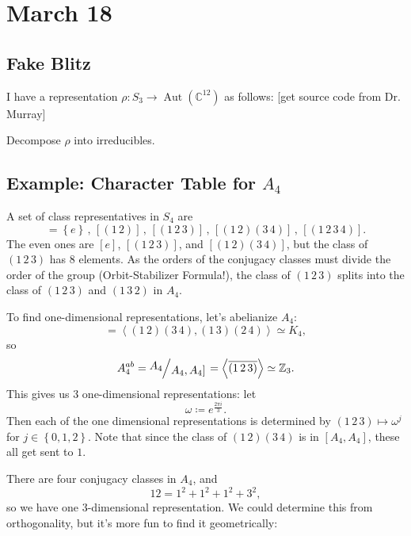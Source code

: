 \documentclass[12pt]{article}
\newcommand{\z}{\mathbb{Z}}
\newcommand{\cx}{\mathbb{C}}
\newcommand\setb[1]{\left \{ #1 \right \}}
\newcommand{\vbrack}[1]{\left \langle #1 \right \rangle}
\newcommand{\quotient}[2]{{\makebox[\width-2.3pt][l]{\raisebox{.2em}{$#1$}}\left/\raisebox{-.2em}{$#2$}\right.}}
\theoremstyle{definition}
\DeclareMathOperator\Aut{Aut}
\begin{document}
\section{March 18}
\subsection{Fake Blitz}
I have a representation $\rho : S_3 \to \Aut(\cx^{12})$ as follows: [get source code from Dr. Murray]

Decompose $\rho$ into irreducibles.
\subsection{Example: Character Table for \texorpdfstring{$A_4$}{A4}}
A set of class representatives in $S_4$ are 
\begin{equation}
    [e] = \setb{e} \,,\,  [(1\,2)] \,,\, [(1\,2\,3)] \,,\, [(1\,2)(3\,4)] \,,\, [(1\,2\,3\,4)].
\end{equation}
The even ones are $[e]$, $[(1\,2\,3)]$, and $[(1\,2)(3\,4)]$, but the class of $(1\,2\,3)$ has 8 elements. As the orders of the conjugacy classes must divide the order of the group (Orbit-Stabilizer Formula!), the class of $(1\,2\,3)$ splits into the class of $(1\,2\,3)$ and $(1\,3\,2)$ in $A_4$. 

To find one-dimensional representations, let's abelianize $A_4$:
\begin{equation}
    [A_4 , A_4] = \vbrack{(1\,2)(3\,4) , (1\,3)(2\,4)} \simeq K_4,
\end{equation}
so 
\begin{equation}
    A_4^{ab} = \quotient{A_4}{A_4 , A_4]} = \left \langle \overline{(1\,2\,3)} \right \rangle \simeq \z_3.
\end{equation}
This gives us 3 one-dimensional representations: let 
\begin{equation}
    \omega \coloneqq  e^{\frac{2\pi i}{3}}.
\end{equation}
Then each of the one dimensional representations is determined by $(1\,2\,3) \mapsto \omega^j$ for $j \in \setb{0,1,2}$. Note that since the class of $(1\,2)(3\,4)$ is in $[A_4 , A_4]$, these all get sent to $1$.

There are four conjugacy classes in $A_4$, and 
\begin{equation}
    12 = 1^2 + 1^2 + 1^2 + 3^2,
\end{equation}
so we have one 3-dimensional representation. We could determine this from orthogonality, but it's more fun to find it geometrically:
\end{document}
